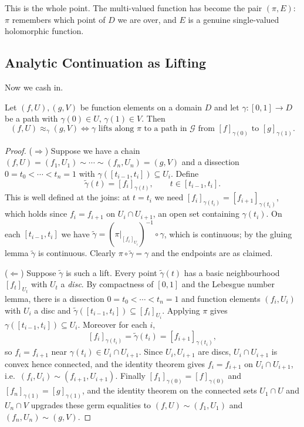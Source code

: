 This is the whole point. The multi-valued function has become the pair $(\pi, E)$: $\pi$
remembers which point of $D$ we are over, and $E$ is a genuine single-valued holomorphic
function.

\subsection{Analytic Continuation as Lifting}

Now we cash in.

\begin{theorem}\label{thm:contislifting}
	Let $(f,U), (g,V)$ be function elements on a domain $D$ and let $\gamma : [0,1] \to D$
	be a path with $\gamma(0) \in U$, $\gamma(1) \in V$. Then
	$$
	(f,U) \approx_\gamma (g,V) \iff \gamma \text{ lifts along } \pi \text{ to a path in } \mathcal{G} \text{ from } [f]_{\gamma(0)} \text{ to } [g]_{\gamma(1)}.
	$$
\end{theorem}

\begin{proof}
	($\Rightarrow$) Suppose we have a chain $(f,U) = (f_1,U_1) \sim \cdots \sim (f_n,U_n) = (g,V)$
	and a dissection $0 = t_0 < \cdots < t_n = 1$ with $\gamma([t_{i-1},t_i]) \subseteq U_i$.
	Define
	$$
	\tilde\gamma(t) = [f_i]_{\gamma(t)}, \qquad t \in [t_{i-1}, t_i].
	$$
	This is well defined at the joins: at $t = t_i$ we need $[f_i]_{\gamma(t_i)} =
	[f_{i+1}]_{\gamma(t_i)}$, which holds since $f_i = f_{i+1}$ on $U_i \cap U_{i+1}$, an
	open set containing $\gamma(t_i)$. On each $[t_{i-1},t_i]$ we have
	$\tilde\gamma = (\pi|_{[f_i]_{U_i}})^{-1}\circ\gamma$, which is continuous; by the
	gluing lemma $\tilde\gamma$ is continuous. Clearly $\pi \circ \tilde\gamma = \gamma$
	and the endpoints are as claimed.

	($\Leftarrow$) Suppose $\tilde\gamma$ is such a lift. Every point $\tilde\gamma(t)$ has
	a basic neighbourhood $[f_t]_{U_t}$ with $U_t$ a \emph{disc}. By compactness of $[0,1]$
	and the Lebesgue number lemma, there is a dissection
	$0 = t_0 < \cdots < t_n = 1$ and function elements $(f_i, U_i)$ with $U_i$ a disc and
	$\tilde\gamma([t_{i-1},t_i]) \subseteq [f_i]_{U_i}$. Applying $\pi$ gives
	$\gamma([t_{i-1},t_i]) \subseteq U_i$. Moreover for each $i$,
	$$
	[f_i]_{\gamma(t_i)} = \tilde\gamma(t_i) = [f_{i+1}]_{\gamma(t_i)},
	$$
	so $f_i = f_{i+1}$ near $\gamma(t_i) \in U_i \cap U_{i+1}$. Since $U_i, U_{i+1}$ are
	discs, $U_i \cap U_{i+1}$ is convex hence connected, and the identity theorem gives
	$f_i = f_{i+1}$ on $U_i \cap U_{i+1}$, i.e.\ $(f_i,U_i)\sim(f_{i+1},U_{i+1})$. Finally
	$[f_1]_{\gamma(0)} = [f]_{\gamma(0)}$ and $[f_n]_{\gamma(1)} = [g]_{\gamma(1)}$, and the
	identity theorem on the connected sets $U_1 \cap U$ and $U_n \cap V$ upgrades these germ
	equalities to $(f,U)\sim(f_1,U_1)$ and $(f_n,U_n)\sim(g,V)$.
\end{proof}

